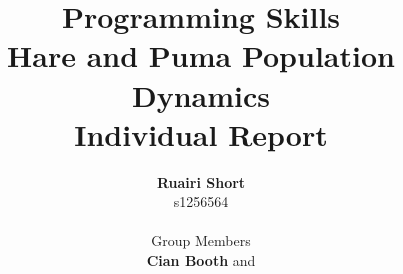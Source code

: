 \documentclass[12pt]{article}    %
\title{\textbf{Programming Skills}\\Hare and Puma Population Dynamics\\Individual Report}  %
\author{\textbf{Ruairi Short}\\s1256564\\\\Group Members\\\textbf{Cian Booth} and \textbf{\pa}}     %
\date{}   %
\numberwithin{equation}{section}
\begin{document}

\maketitle                 %
\begin{center}

\abstract{}
\clearpage
{}
\end{center}

\newpage

\end{document}
